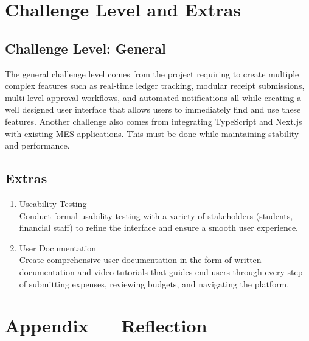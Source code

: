 \documentclass{article}
\begin{document}
\section{Challenge Level and Extras}
\subsection{Challenge Level: General}

\hspace{0.5cm}The general challenge level comes from the project requiring to create multiple complex features such as 
real-time ledger tracking, modular receipt submissions, multi-level approval workflows, and automated 
notifications all while creating a well designed user interface that allows users to immediately find 
and use these features. Another challenge also comes from integrating TypeScript and Next.js with existing 
MES applications. This must be done while maintaining stability and performance. 

\subsection{Extras}

\begin{enumerate}
    \item Useability Testing \\
    Conduct formal usability testing with a variety of stakeholders (students, financial staff) to refine the interface and ensure a smooth user experience.
    \item User Documentation \\
    Create comprehensive user documentation in the form of written documentation and video tutorials that guides end-users through every step of submitting expenses, reviewing budgets, and navigating the platform.
\end{enumerate}

\newpage{}

\section*{Appendix --- Reflection}


\end{document}
